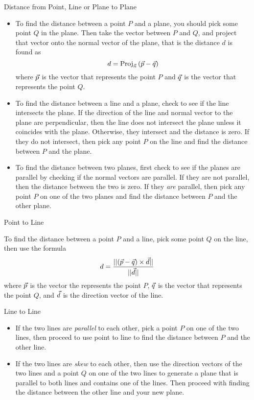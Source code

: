 \begin{definition}{Distance from Point, Line or Plane to Plane}
\begin{itemize}
\item To find the distance between a point $P$ and a plane, you should pick some point $Q$ in the plane. Then take the vector between $P$ and $Q$, and project that vector onto the normal vector of the plane, that is the distance $d$ is found as $$d=\mathrm{Proj}_{\vec{n}}\left({\vec{p}-\vec{q}}\right) $$ where $\vec{p}$ is the vector that represents the point $P$ and $\vec{q}$ is the vector that represents the point $Q$.

\vspace{1em}

\item To find the distance between a line and a plane, check to see if the line intersects the plane. If the direction of the line and normal vector to the plane are perpendicular, then the line does not intersect the plane unless it coincides with the plane. Otherwise, they intersect and the distance is zero. If they do not intersect, then pick any point $P$ on the line and find the distance between $P$ and the plane.

\vspace{1em}

\item To find the distance between two planes, first check to see if the planes are parallel by checking if the normal vectors are parallel. If they are not parallel, then the distance between the two is zero. If they \textit{are} parallel, then pick any point $P$ on one of the two planes and find the distance between $P$ and the other plane.
\end{itemize}
\end{definition}

\begin{definition}{Point to Line}

To find the distance between a point $P$ and a line, pick some point $Q$ on the line, then use the formula $$d=\frac{||(\vec{p}-\vec{q})\times\vec{d}||}{||\vec{d}||} $$ where $\vec{p}$ is the vector the represents the point $P$, $\vec{q}$ is the vector that represents the point $Q$, and $\vec{d}$ is the direction vector of the line.
\end{definition}

\begin{definition}{Line to Line}
\begin{itemize}
\item If the two lines are \textit{parallel} to each other, pick a point $P$ on one of the two lines, then proceed to use point to line to find the distance between $P$ and the other line.

\vspace{1em}

\item If the two lines are \textit{skew} to each other, then use the direction vectors of the two lines and a point $Q$ on one of the two lines to generate a plane that is parallel to both lines and contains one of the lines. Then proceed with finding the distance between the other line and your new plane.
\end{itemize}
\end{definition}

